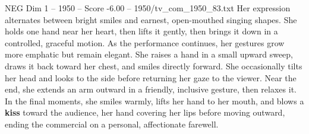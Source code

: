 \begin{textsample}{NEG Dim 1 – 1950 – Score -6.00 – 1950/tv\_com\_1950\_83.txt}
Her expression alternates between bright smiles and earnest, open-mouthed singing shapes.
She holds one hand near her heart, then lifts it gently, then brings it down in a controlled, graceful motion.
As the performance continues, her gestures grow more emphatic but remain elegant.
She raises a hand in a small upward sweep, draws it back toward her chest, and smiles directly forward.
She occasionally tilts her head and looks to the side before returning her gaze to the viewer.
Near the end, she extends an arm outward in a friendly, inclusive gesture, then relaxes it.
In the final moments, she smiles warmly, lifts her hand to her mouth, and blows a \textbf{kiss} toward the audience, her hand covering her lips before moving outward, ending the commercial on a personal, affectionate farewell.

\end{textsample}
